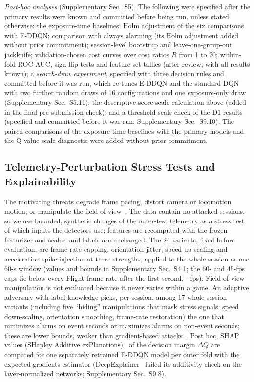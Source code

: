 \emph{Post-hoc analyses} (Supplementary Sec.~S5). The following were specified after the primary results were known and committed before being run, unless stated otherwise: the exposure-time baselines; Holm adjustment of the six comparisons with E-DDQN; comparison with always alarming (its Holm adjustment added without prior commitment); session-level bootstrap and leave-one-group-out jackknife; validation-chosen cost curves over cost ratios $R$ from 1 to 20; within-fold ROC-AUC, sign-flip tests and feature-set tallies (after review, with all results known); a \emph{search-draw experiment}, specified with three decision rules and committed before it was run, which re-tunes E-DDQN and the standard DQN with two further random draws of 16 configurations and one exposure-only draw (Supplementary Sec.~S5.11); the descriptive score-scale calculation above (added in the final pre-submission check); and a threshold-scale check of the D1 results (specified and committed before it was run; Supplementary Sec.~S9.10). The paired comparisons of the exposure-time baselines with the primary models and the Q-value-scale diagnostic were added without prior commitment.

\subsection{Telemetry-Perturbation Stress Tests and Explainability}
\label{sec:threat}
\label{sec:shap}
The motivating threats degrade frame pacing, distort camera or locomotion motion, or manipulate the field of view~\cite{odeleye2021framerate,tseng2022dark,kundu2025securing}. The data contain no attacked sessions, so we use bounded, synthetic changes of the outer-test telemetry as a stress test of which inputs the detectors use; features are recomputed with the frozen featurizer and scaler, and labels are unchanged. The 24 variants, fixed before evaluation, are frame-rate capping, orientation jitter, speed up-scaling and acceleration-spike injection at three strengths, applied to the whole session or one 60-s window (values and bounds in Supplementary Sec.~S4.1; the 60- and 45-fps caps lie below every Flight frame rate after the first second, \SSFpsFlightMin--\SSFpsFlightMax\,fps). Field-of-view manipulation is not evaluated because it never varies within a game. An adaptive adversary with label knowledge picks, per session, among 17 whole-session variants (including five ``hiding'' manipulations that mask stress signals: speed down-scaling, orientation smoothing, frame-rate restoration) the one that minimizes alarms on event seconds or maximizes alarms on non-event seconds; these are lower bounds, weaker than gradient-based attacks~\cite{kundu2025securing,ahmed2025adversarialvr}. Post hoc, SHAP values (SHapley Additive exPlanations)~\cite{lundberg2017shap} of the decision margin $\Delta Q$ are computed for one separately retrained E-DDQN model per outer fold with the expected-gradients estimator (DeepExplainer~\cite{shrikumar2017deeplift} failed its additivity check on the layer-normalized networks; Supplementary Sec.~S9.8).
